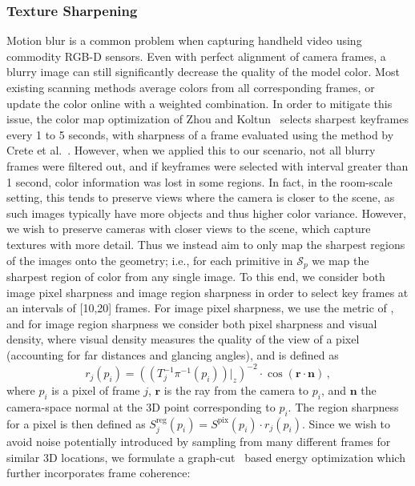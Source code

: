 \subsubsection{Texture Sharpening}
\label{subsec:3dlite-color-sharp}
Motion blur is a common problem when capturing handheld video using commodity RGB-D sensors.
Even with perfect alignment of camera frames, a blurry image can still significantly decrease the quality of the model color. 
Most existing scanning methods average colors from all corresponding frames, or update the color online with a weighted combination. 
In order to mitigate this issue, the color map optimization of Zhou and Koltun~\cite{zhou2014color} selects sharpest keyframes every 1 to 5 seconds, with sharpness of a frame evaluated using the method by Crete et al.~\cite{crete2007blur}. 
However, when we applied this to our scenario, not all blurry frames were filtered out, and if keyframes were selected with interval greater than 1 second, color information was lost in some regions. 
In fact, in the room-scale setting, this tends to preserve views where the camera is closer to the scene, as such images typically have more objects and thus higher color variance.
However, we wish to preserve cameras with closer views to the scene, which capture textures with more detail.
Thus we instead aim to only map the sharpest regions of the images onto the geometry; i.e., for each primitive in $\mathcal{S}_p$ we map the sharpest region of color from any single image.
To this end, we consider both image pixel sharpness and image region sharpness in order to select key frames at an intervals of [10,20] frames.
For image pixel sharpness, we use the metric of \cite{vu2012bf}, and for image region sharpness we consider both pixel sharpness and visual density, where visual density measures the quality of the view of a pixel (accounting for far distances and glancing angles), and is defined as
\begin{equation}
r_j(p_i) = \left((T_j^{-1}\pi^{-1}(p_i))\big|_z\right)^{-2} \cdot \cos(\mathbf{r}\cdot \mathbf{n})\,,
\label{eq:visual-res}
\end{equation}
where $p_i$ is a pixel of frame $j$, $\mathbf{r}$ is the ray from the camera to $p_i$, and $\mathbf{n}$ the camera-space normal at the 3D point corresponding to $p_i$.
The region sharpness for a pixel is then defined as $S^{\textrm{reg}}_j(p_i)=S^{\textrm{pix}}(p_i)\cdot r_j(p_i)$. 
Since we wish to avoid noise potentially introduced by sampling from many different frames for similar 3D locations, we formulate a graph-cut~\cite{boykov2001fast} based energy optimization which further incorporates frame coherence:
